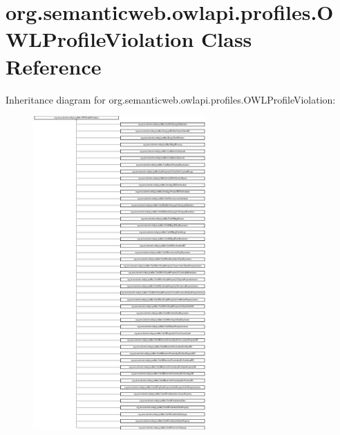 \hypertarget{classorg_1_1semanticweb_1_1owlapi_1_1profiles_1_1_o_w_l_profile_violation}{\section{org.\-semanticweb.\-owlapi.\-profiles.\-O\-W\-L\-Profile\-Violation Class Reference}
\label{classorg_1_1semanticweb_1_1owlapi_1_1profiles_1_1_o_w_l_profile_violation}
}
Inheritance diagram for org.\-semanticweb.\-owlapi.\-profiles.\-O\-W\-L\-Profile\-Violation\-:\begin{figure}[H]
\begin{center}
\leavevmode
\includegraphics[height=12.000000cm]{classorg_1_1semanticweb_1_1owlapi_1_1profiles_1_1_o_w_l_profile_violation}
\end{center}
\end{figure}
